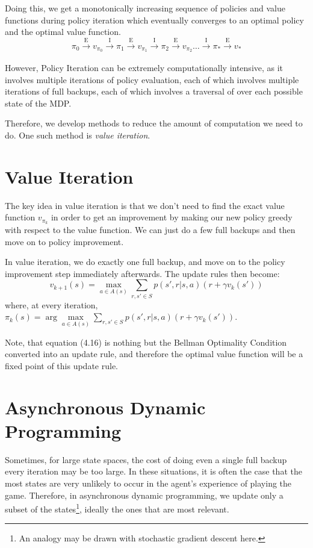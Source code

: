 \documentclass[12pt]{report}
\begin{document}
Doing this, we get a monotonically increasing sequence of policies and value functions during policy iteration which eventually converges to an optimal policy and the optimal value function.
\begin{equation*}
    \pi_{0} \xrightarrow[]{\text{E}} v_{\pi_{0}} \xrightarrow[]{\text{I}} \pi_{1} \xrightarrow[]{\text{E}} v_{\pi_{1}} \xrightarrow[]{\text{I}} \pi_{2} \xrightarrow[]{\text{E}} v_{\pi_{2}} \dots \xrightarrow[]{\text{I}} \pi_{*} \xrightarrow[]{\text{E}} v_{*}
\end{equation*}

However, Policy Iteration can be extremely computationally intensive, as it involves multiple iterations of policy evaluation, each of which involves multiple iterations of full backups, each of which involves a traversal of over each possible state of the MDP. 

Therefore, we develop methods to reduce the amount of computation we need to do. One such method is \textit{value iteration}.

\section{Value Iteration}
The key idea in value iteration is that we don't need to find the exact value function $v_{\pi_{k}}$ in order to get an improvement by making our new policy greedy with respect to the value function. We can just do a few full backups and then move on to policy improvement.

In value iteration, we do exactly one full backup, and move on to the policy improvement step immediately afterwards. The update rules then become:
\begin{equation}
    v_{k + 1}(s) = \max\limits_{a \in A(s)} \sum\limits_{r, s' \in S} p(s', r | s, a) (r + \gamma v_{k}(s'))
\end{equation}
where, at every iteration, $\pi_{k}(s) = \arg\max\limits_{a \in A(s)} \sum\limits_{r, s' \in S} p(s', r | s, a) (r + \gamma v_{k}(s'))$.

Note, that equation (4.16) is nothing but the Bellman Optimality Condition converted into an update rule, and therefore the optimal value function will be a fixed point of this update rule.
\section{Asynchronous Dynamic Programming}
Sometimes, for large state spaces, the cost of doing even a single full backup every iteration may be too large. In these situations, it is often the case that the most states are very unlikely to occur in the agent's experience of playing the game. 
Therefore, in asynchronous dynamic programming, we update only a subset of the states\footnote{An analogy may be drawn with stochastic gradient descent here.}, ideally the ones that are most relevant. 
\end{document}
